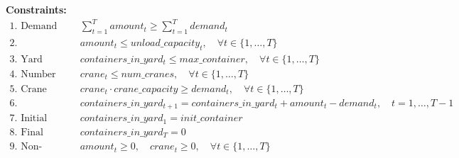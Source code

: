 \documentclass{article}
\begin{document}
\textbf{Constraints:}
\begin{align}
    \text{1. Demand Fulfillment:} & \quad \sum_{t=1}^{T} amount_t \geq \sum_{t=1}^{T} demand_t \\
    \text{2. Unloading Capacity:} & \quad amount_t \leq unload\_capacity_t, \quad \forall t \in \{1, \ldots, T\} \\
    \text{3. Yard Capacity:} & \quad containers\_in\_yard_t \leq max\_container, \quad \forall t \in \{1, \ldots, T\} \\
    \text{4. Number of Cranes:} & \quad crane_t \leq num\_cranes, \quad \forall t \in \{1, \ldots, T\} \\
    \text{5. Crane Loading Capacity:} & \quad crane_t \cdot crane\_capacity \geq demand_t, \quad \forall t \in \{1, \ldots, T\}\\
    \text{6. Containers in Yard Calculation:} & \quad containers\_in\_yard_{t+1} = containers\_in\_yard_t + amount_t - demand_t, \quad t = 1, \ldots, T-1 \\
    \text{7. Initial Condition:} & \quad containers\_in\_yard_1 = init\_container \\
    \text{8. Final Condition:} & \quad containers\_in\_yard_T = 0 \\
    \text{9. Non-negativity:} & \quad amount_t \geq 0, \quad crane_t \geq 0, \quad \forall t \in \{1, \ldots, T\}
\end{align}
\end{document}
